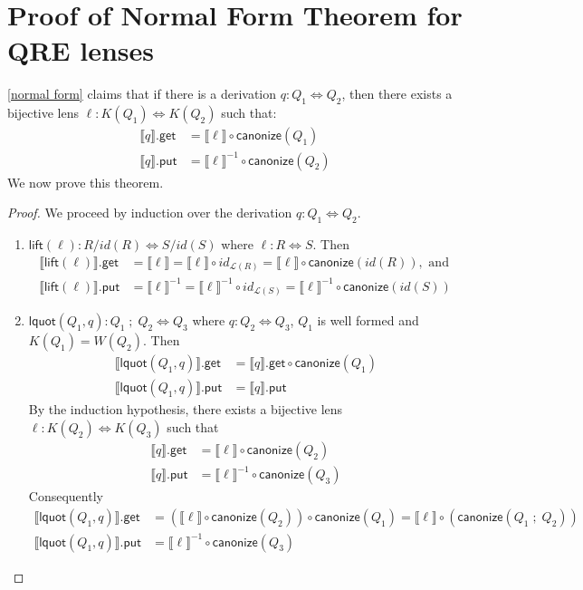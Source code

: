 \documentclass[acmsmall,review,anonymous]{acmart}
\newcommand{\codefont}[1]{\ensuremath{\mathsf{#1}}}
\newcommand{\kw}[1]{\codefont{#1}}
\newcommand{\canonize}{\ensuremath{\kw{canonize}}}
\newcommand{\get}{\ensuremath{\kw{get}}}
\newcommand{\lput}{\ensuremath{\kw{put}}}
\newcommand{\lquot}{\ensuremath{\kw{lquot}}}
\begin{document}
\section{Proof of Normal Form Theorem for QRE lenses}
\cref{normal form} claims that if there is a derivation $q : Q_1
\Leftrightarrow Q_2$, then there exists a bijective lens $\ell : K(Q_1)
\Leftrightarrow K(Q_2)$ such that:
\begin{align*}
\llbracket q \rrbracket.\get &= \llbracket \ell \rrbracket\circ
\canonize(Q_1)\\
\llbracket q \rrbracket.\lput &= \llbracket \ell \rrbracket^{-1} \circ
\canonize(Q_2)
\end{align*}
We now prove this theorem.
\begin{proof}
We proceed by induction over the derivation $q : Q_1 \Leftrightarrow Q_2$.
\begin{enumerate}
  \item
  $\kw{lift}(\ell): R/\mathit{id}(R) \Leftrightarrow S/\mathit{id}(S)$ where
  $\ell : R \Leftrightarrow S$. Then
  \begin{align*}
\llbracket \kw{lift}(\ell) \rrbracket.\get &=  \llbracket \ell \rrbracket
= \llbracket \ell \rrbracket \circ id_{\mathcal{L}(R)} =
\llbracket \ell \rrbracket \circ \canonize(\mathit{id}(R)), \text{ and }\\
\llbracket \kw{lift}(\ell) \rrbracket.\lput &= \llbracket \ell
\rrbracket^{-1} = \llbracket \ell \rrbracket^{-1} \circ id_{\mathcal{L}(S)} =
\llbracket \ell \rrbracket^{-1} \circ \canonize(id(S))
\end{align*}
\item
$\lquot(Q_1, q): Q_1 \; ; \; Q_2 \Leftrightarrow Q_3$ where $q : Q_2
\Leftrightarrow Q_3$, $Q_1$ is well formed and $K(Q_1) = W(Q_2)$. Then
\begin{align*}
\llbracket \lquot(Q_1, q) \rrbracket.\get  &= \llbracket q
\rrbracket.\get \circ \canonize(Q_1)\\
\llbracket \lquot(Q_1, q) \rrbracket.\lput &= \llbracket q \rrbracket.\lput
\end{align*}
By the induction hypothesis, there exists a bijective lens $\ell :
K(Q_2) \Leftrightarrow K(Q_3)$ such that
\begin{align*}
\llbracket q \rrbracket.\get &= \llbracket \ell \rrbracket \circ
\canonize(Q_2)\\
\llbracket q \rrbracket.\lput &= \llbracket \ell \rrbracket^{-1} \circ
\canonize(Q_3)
\end{align*}
Consequently
\begin{align*}
\llbracket \lquot(Q_1, q)\rrbracket.\get  &= (\llbracket \ell \rrbracket \circ
\canonize(Q_2)) \circ \canonize(Q_1) = \llbracket \ell \rrbracket \circ
(\canonize(Q_1 \; ; \; Q_2))\\
\llbracket \lquot(Q_1, q) \rrbracket.\lput &= \llbracket \ell \rrbracket^{-1} \circ
\canonize(Q_3)
\end{align*}


\end{enumerate}
\end{proof}
\end{document}
